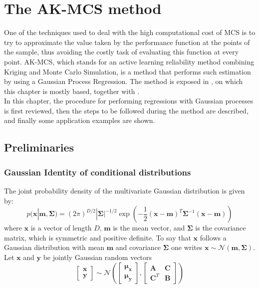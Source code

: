 \chapter{The AK-MCS method}
\label{ch:5}
One of the techniques used to deal with the high computational cost of MCS is to try to approximate the value taken by the performance function at the points of the sample, thus avoiding the costly task of evaluating this function at every point. AK-MCS, which stands for an active learning reliability method combining Kriging and Monte Carlo Simulation, is a method that performs such estimation by using a Gaussian Process Regression. The method is exposed in \citep{Echard2011}, on which this chapter is mostly based, together with \citep{RW}. \\

In this chapter, the procedure for performing regressions with Gaussian processes is first reviewed, then the steps to be followed during the method are described, and finally some application examples are shown.

\section{Preliminaries}
\subsection{Gaussian Identity of conditional distributions}
The joint probability density of the multivariate Gaussian distribution is given by:
\begin{equation}
  p(\bm{x}|\bm{m},\bm{\Sigma}) = (2\pi)^{D/2}|\bm{\Sigma}|^{-1/2}\exp{\left(-\frac{1}{2}(\bm{x}-\bm{m})^{T}\bm{\Sigma}^{-1}(\bm{x}-\bm{m})\right)}
\end{equation}
where $\bm{x}$ is a vector of length $D$, $\bm{m}$ is the mean vector, and $\bm{\Sigma}$ is the covariance matrix, which is symmetric and positive definite. To say that $\bm{x}$ follows a Gaussian distribution with mean  $\bm{m}$ and covariance $\bm{\Sigma}$ one writes $\bm{x} \sim \mathcal{N}(\bm{m}, \bm{\Sigma})$. \\

Let $\bm{x}$ and $\bm{y}$ be jointly Gaussian random vectors
\begin{equation}
  \begin{bmatrix}
    \bm{x} \\ \bm{y}
  \end{bmatrix}
  \sim \mathcal{N}\left(
    \begin{bmatrix}
    \bm{\mu_x} \\ \bm{\mu_y}
    \end{bmatrix} , \begin{bmatrix}
      \bm{A} & \bm{C} \\ \bm{C}^T & \bm{B}
    \end{bmatrix} \right)
\end{equation}

